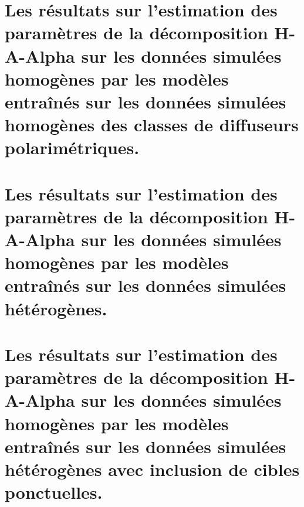 \section{Les résultats sur l'estimation des paramètres de la décomposition H-A-Alpha sur les données simulées homogènes par les modèles entraînés sur les données simulées homogènes des classes de diffuseurs polarimétriques.}
\label{annex-a:homogeneous_haalpha_homogeneous_t3_results=0"}


\section{Les résultats sur l'estimation des paramètres de la décomposition H-A-Alpha sur les données simulées homogènes par les modèles entraînés sur les données simulées hétérogènes.}
\label{annex-a:homogeneous_haalpha_random_texture_t3_results=0"}


\section{Les résultats sur l'estimation des paramètres de la décomposition H-A-Alpha sur les données simulées homogènes par les modèles entraînés sur les données simulées hétérogènes avec inclusion de cibles ponctuelles.}
\label{annex-a:homogeneous_haalpha_random_texture_with_pts_t3_results=0"}













